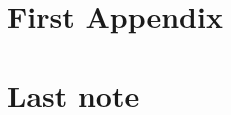 \documentclass[12pt]{book}
\begin{document}
\iffalse

   The \appendix macro can be used to indicate that following
   sections or chapters are to be numbered as appendices.
   Appendices can be used for the article class too:

\fi

\appendix
\chapter{First Appendix}

\iffalse

   The backmatter behaves like the frontmatter.
   It has the same issue with section numbering.

\fi

\backmatter
\chapter{Last note}
\end{document}
